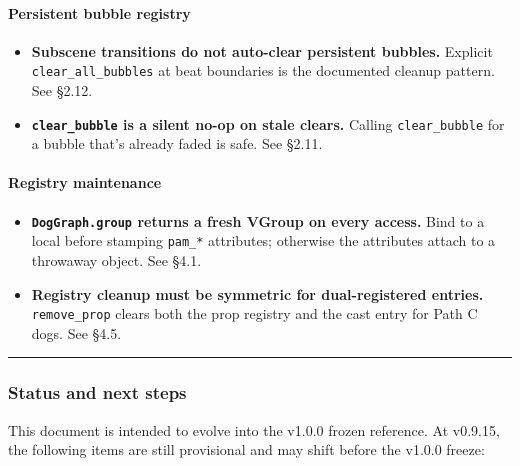 \documentclass[
  11pt,
]{book}
\providecommand{\tightlist}{%
  \setlength{\itemsep}{0pt}\setlength{\parskip}{0pt}}
\begin{document}
\paragraph{Persistent bubble registry}\label{persistent-bubble-registry}

\begin{itemize}
\tightlist
\item
  \textbf{Subscene transitions do not auto-clear persistent bubbles.}
  Explicit \texttt{clear\_all\_bubbles} at beat boundaries is the
  documented cleanup pattern. See §2.12.
\item
  \textbf{\texttt{clear\_bubble} is a silent no-op on stale clears.}
  Calling \texttt{clear\_bubble} for a bubble that's already faded is
  safe. See §2.11.
\end{itemize}

\paragraph{Registry maintenance}\label{registry-maintenance}

\begin{itemize}
\tightlist
\item
  \textbf{\texttt{DogGraph.group} returns a fresh VGroup on every
  access.} Bind to a local before stamping \texttt{pam\_*} attributes;
  otherwise the attributes attach to a throwaway object. See §4.1.
\item
  \textbf{Registry cleanup must be symmetric for dual-registered
  entries.} \texttt{remove\_prop} clears both the prop registry and the
  cast entry for Path C dogs. See §4.5.
\end{itemize}

\begin{center}\rule{0.5\linewidth}{0.5pt}\end{center}

\subsubsection{Status and next steps}\label{status-and-next-steps}

This document is intended to evolve into the v1.0.0 frozen reference. At
v0.9.15, the following items are still provisional and may shift before
the v1.0.0 freeze:
\end{document}
